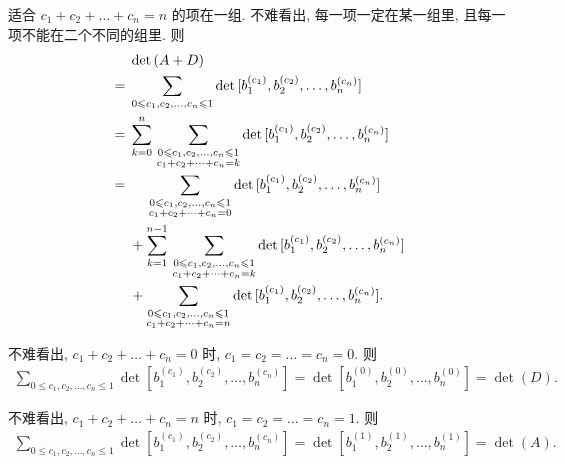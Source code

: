 \begin{example}
    适合 \(c_1 + c_2 + \dots + c_n = n\) 的项在一组.
    不难看出,
    每一项一定在某一组里,
    且每一项不能在二个不同的组里.
    则
    \begin{align*}
             &
        \det {(A + D)}
        \\
        = {} &
        \sum_{0 \leq c_1, c_2, \dots, c_n \leq 1}
        \det {[b_1^{(c_1)}, b_2^{(c_2)}, \dots, b_n^{(c_n)}]}
        \\
        = {} &
        \sum_{k = 0}^{n}\,
        \sum_{\substack{0 \leq c_1, c_2, \dots, c_n \leq 1 \\
                c_1 + c_2 + \dots + c_n = k}}
        \det {[b_1^{(c_1)}, b_2^{(c_2)}, \dots, b_n^{(c_n)}]}
        \\
        = {} &
        \hphantom{{} + {}}
        \sum_{\substack{0 \leq c_1, c_2, \dots, c_n \leq 1 \\
                c_1 + c_2 + \dots + c_n = 0}}
        \det {[b_1^{(c_1)}, b_2^{(c_2)}, \dots, b_n^{(c_n)}]}
        \\
             &
        +
        \sum_{k = 1}^{n-1}\,
        \sum_{\substack{0 \leq c_1, c_2, \dots, c_n \leq 1 \\
                c_1 + c_2 + \dots + c_n = k}}
        \det {[b_1^{(c_1)}, b_2^{(c_2)}, \dots, b_n^{(c_n)}]}
        \\
             &
        +
        \sum_{\substack{0 \leq c_1, c_2, \dots, c_n \leq 1 \\
                c_1 + c_2 + \dots + c_n = n}}
        \det {[b_1^{(c_1)}, b_2^{(c_2)}, \dots, b_n^{(c_n)}]}.
    \end{align*}

    不难看出, \(c_1 + c_2 + \dots + c_n = 0\) 时,
    \(c_1 = c_2 = \dots = c_n = 0\).
    则
    \begin{align*}
        \sum_{0 \leq c_1, c_2, \dots, c_n \leq 1}
        \det {[b_1^{(c_1)}, b_2^{(c_2)}, \dots, b_n^{(c_n)}]}
        =
        \det {[b_1^{(0)}, b_2^{(0)}, \dots, b_n^{(0)}]}
        =
        \det {(D)}.
    \end{align*}

    不难看出, \(c_1 + c_2 + \dots + c_n = n\) 时,
    \(c_1 = c_2 = \dots = c_n = 1\).
    则
    \begin{align*}
        \sum_{0 \leq c_1, c_2, \dots, c_n \leq 1}
        \det {[b_1^{(c_1)}, b_2^{(c_2)}, \dots, b_n^{(c_n)}]}
        =
        \det {[b_1^{(1)}, b_2^{(1)}, \dots, b_n^{(1)}]}
        =
        \det {(A)}.
    \end{align*}


\end{example}
